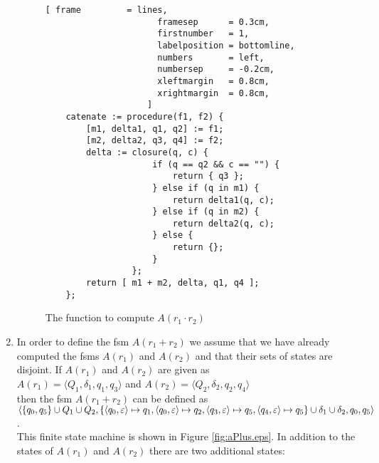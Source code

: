 \begin{enumerate}
    \begin{figure}[!ht]
    \centering
    \begin{Verbatim}[ frame         = lines, 
                      framesep      = 0.3cm, 
                      firstnumber   = 1,
                      labelposition = bottomline,
                      numbers       = left,
                      numbersep     = -0.2cm,
                      xleftmargin   = 0.8cm,
                      xrightmargin  = 0.8cm,
                    ]
    catenate := procedure(f1, f2) {
        [m1, delta1, q1, q2] := f1;
        [m2, delta2, q3, q4] := f2;
        delta := closure(q, c) {
                     if (q == q2 && c == "") {
                         return { q3 };
                     } else if (q in m1) {
                         return delta1(q, c);
                     } else if (q in m2) {
                         return delta2(q, c);
                     } else {
                         return {};
                     }
                 };
        return [ m1 + m2, delta, q1, q4 ];
    };
    \end{Verbatim}
    \vspace*{-0.3cm}
    \caption{The function to compute $A(r_1 \cdot r_2)$}
    \label{fig:catenate.stlx}
    \end{figure}
\item In order to define the fsm  $A(r_1 + r_2)$ we assume that we have already computed
      the fsms $A(r_1)$ and $A(r_2)$ and that their sets of states are disjoint.
      If  $A(r_1)$ and $A(r_2)$ are given as
      \\[0.2cm]
      \hspace*{1.3cm}
      $A(r_1) = \langle Q_1, \delta_1, q_1, q_3 \rangle$ \quad and \quad
      $A(r_2) = \langle Q_2, \delta_2, q_2, q_4 \rangle$
      \\[0.2cm]
      then the fsm $A(r_1 + r_2)$ can be defined as
      \\[0.2cm]
      \hspace*{0.0cm}
       $\langle \{ q_0, q_5 \} \cup Q_1 \cup Q_2, 
                \{ \pair(q_0,\varepsilon) \mapsto q_1, \pair(q_0,\varepsilon) \mapsto q_2,
                   \pair(q_3,\varepsilon) \mapsto q_5, \pair(q_4,\varepsilon) \mapsto q_5 \} 
                   \cup \delta_1 \cup \delta_2, q_0, q_5 \rangle$.
      \\[0.2cm]
      This finite state machine is shown in Figure \ref{fig:aPlus.eps}.
      In addition to the states of $A(r_1)$ and $A(r_2)$ there are two additional 
      states:
      \begin{enumerate}

\end{enumerate}
\end{enumerate}
